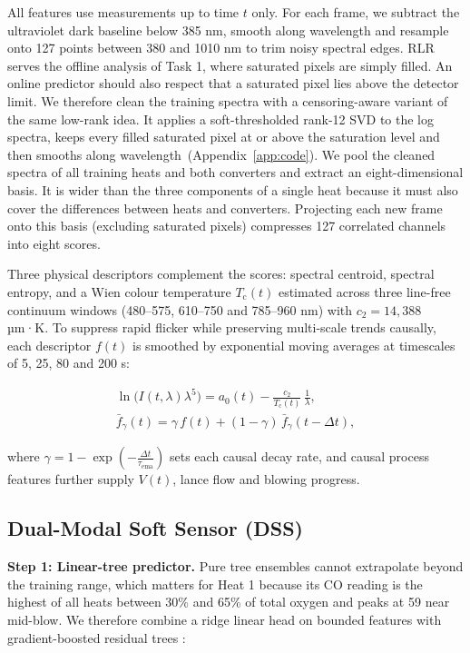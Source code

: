 All features use measurements up to time $t$ only. For each frame, we subtract the ultraviolet dark baseline below 385 nm, smooth along wavelength and resample onto 127 points between 380 and 1010 nm to trim noisy spectral edges. RLR serves the offline analysis of Task 1, where saturated pixels are simply filled. An online predictor should also respect that a saturated pixel lies above the detector limit. We therefore clean the training spectra with a censoring-aware variant of the same low-rank idea. It applies a soft-thresholded rank-12 SVD to the log spectra, keeps every filled saturated pixel at or above the saturation level and then smooths along wavelength\ifpaperappendix\ (Appendix~\ref{app:code})\fi. We pool the cleaned spectra of all training heats and both converters and extract an eight-dimensional basis. It is wider than the three components of a single heat because it must also cover the differences between heats and converters. Projecting each new frame onto this basis (excluding saturated pixels) compresses 127 correlated channels into eight scores.

Three physical descriptors complement the scores: spectral centroid, spectral entropy, and a Wien colour temperature $T_{\mathrm{c}}(t)$ estimated across three line-free continuum windows (480–575, 610–750 and 785–960 nm) with $c_2 = 14{,}388$ µm·K. To suppress rapid flicker while preserving multi-scale trends causally, each descriptor $f(t)$ is smoothed by exponential moving averages at timescales of 5, 25, 80 and 200 s:

\begin{equation}
\begin{gathered}
  \ln\!\bigl(I(t,\lambda)\lambda^{5}\bigr) = a_0(t) - \frac{c_2}{T_{\mathrm{c}}(t)}\,\frac{1}{\lambda}, \\
  \bar{f}_{\gamma}(t) = \gamma\,f(t) + (1-\gamma)\,\bar{f}_{\gamma}(t-\Delta t),
\end{gathered} \label{eq:wien_ema}
\end{equation}

where $\gamma = 1 - \exp\!\left(-\frac{\Delta t}{\tau_{\mathrm{ema}}}\right)$ sets each causal decay rate, and causal process features further supply $V(t)$, lance flow and blowing progress.

\subsection{Dual-Modal Soft Sensor (DSS)}\label{sec:7.2}

\textbf{Step 1: Linear-tree predictor.} Pure tree ensembles cannot extrapolate beyond the training range, which matters for Heat 1 because its CO reading is the highest of all heats between 30\% and 65\% of total oxygen and peaks at 59 near mid-blow. We therefore combine a ridge linear head on bounded features with gradient-boosted residual trees \cite{ref:7}:

